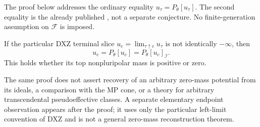 The proof below addresses the ordinary equality \(u_\tau=P_\theta[u_\tau]\).
The second equality is the already published
\cite[Lemma~4.5]{DXZ23}, not a separate conjecture.
No finite-generation assumption on \(\mathcal F\) is imposed.

\begin{corollary}\label{cor:p147-terminal-slice-candidate}
If the particular DXZ terminal slice
\(u_c=\lim_{\tau\uparrow c}u_\tau\) is not identically \(-\infty\), then
\[
                 u_c=P_\theta[u_c]=P_\theta[u_c]_{\mathcal I}.
\]
This holds whether its top nonpluripolar mass is positive or zero.
\end{corollary}

The same proof does not assert recovery of an arbitrary zero-mass
potential from its ideals, a comparison with the MP cone, or a theory for
arbitrary transcendental pseudoeffective classes.
A separate elementary endpoint observation appears after the proof; it
uses only the particular left-limit convention of DXZ and is not a
general zero-mass reconstruction theorem.
